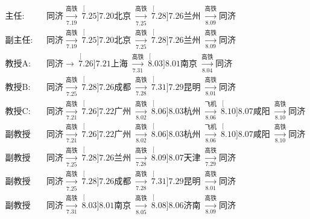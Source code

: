 \documentclass[a4paper,12pt]{ctexart}
\newcommand{\CityI}   {\stackrel[7.25]{7.20}{\text{北京}}}
\newcommand{\CityII}  {\stackrel[7.26]{7.21}{\text{上海}}}
\newcommand{\CityIII} {\stackrel[7.26]{7.22}{\text{广州}}}
\newcommand{\CityIV}  {\stackrel[7.28]{7.26}{\text{兰州}}}
\newcommand{\CityV}   {\stackrel[7.28]{7.26}{\text{成都}}}
\newcommand{\CityVI}  {\stackrel[7.31]{7.29}{\text{昆明}}}
\newcommand{\CityVII} {\stackrel[8.03]{8.01}{\text{南京}}}
\newcommand{\CityIX}  {\stackrel[8.06]{8.03}{\text{杭州}}}
\newcommand{\CityX}   {\stackrel[8.08]{8.06}{\text{济南}}}
\newcommand{\CityXI}  {\stackrel[8.09]{8.07}{\text{天津}}}
\newcommand{\CityXII} {\stackrel[8.10]{8.07}{\text{咸阳}}}
\begin{document}
    \begin{scriptsize}
        \begin{align*}
            \text{主任:}&\ \textit{同济}
                \xrightarrow[7.19]{\text{高铁}}\ \CityI\
                \xrightarrow[7.25]{\text{高铁}}\ \CityIV\
                \xrightarrow[8.09]{\text{高铁}} \textit{同济}\\
            \text{副主任:}&\ \textit{同济}
                \xrightarrow[7.19]{\text{高铁}}\ \CityI\
                \xrightarrow[7.25]{\text{高铁}}\ \CityIV\
                \xrightarrow[8.09]{\text{高铁}} \textit{同济}\\
            \text{教授A:}&\ \textit{同济}
                \xrightarrow{\hspace{13pt}}\ \CityII\
                \xrightarrow[7.31]{\text{高铁}}\ \CityVII\
                \xrightarrow[8.04]{\text{高铁}} \textit{同济}\\
            \text{教授B:}&\ \textit{同济}
                \xrightarrow[7.25]{\text{高铁}}\ \CityV\
                \xrightarrow[7.28]{\text{高铁}}\ \CityVI\
                \xrightarrow[8.01]{\text{高铁}} \textit{同济}\\
            \text{教授C:}&\ \textit{同济}
                \xrightarrow[7.21]{\text{高铁}}\ \CityIII\
                \xrightarrow[8.02]{\text{高铁}}\ \CityIX\
                \xrightarrow[8.06]{\text{飞机}}\ \CityXII\
                \xrightarrow[8.10]{\text{高铁}} \textit{同济}\\
            \text{副教授A:}&\ \textit{同济}
                \xrightarrow[7.21]{\text{高铁}}\ \CityIII\
                \xrightarrow[8.02]{\text{高铁}}\ \CityIX\
                \xrightarrow[8.06]{\text{飞机}}\ \CityXII\
                \xrightarrow[8.10]{\text{高铁}} \textit{同济}\\
            \text{副教授B:}&\ \textit{同济}
                \xrightarrow[7.25]{\text{高铁}}\ \CityIV\
                \xrightarrow[7.28]{\text{高铁}}\ \CityXI\
                \xrightarrow[7.29]{\text{高铁}} \textit{同济}\\
            \text{副教授C:}&\ \textit{同济}
                \xrightarrow[7.25]{\text{高铁}}\ \CityV\
                \xrightarrow[7.28]{\text{高铁}}\ \CityVI\
                \xrightarrow[8.01]{\text{高铁}} \textit{同济}\\
            \text{副教授D:}&\ \textit{同济}
                \xrightarrow[7.31]{\text{高铁}}\ \CityVII\
                \xrightarrow[8.05]{\text{高铁}}\ \CityX\
                \xrightarrow[8.09]{\text{高铁}} \textit{同济}\\

\end{align*}
\end{scriptsize}
\end{document}
